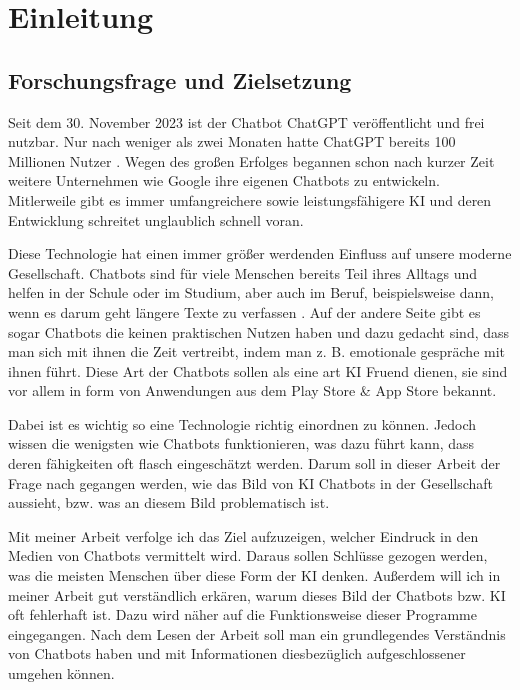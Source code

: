 \section{Einleitung}
	\subsection{Forschungsfrage und Zielsetzung}
	Seit dem 30. November 2023 ist der Chatbot ChatGPT veröffentlicht und frei nutzbar. 
	Nur nach weniger als zwei Monaten hatte ChatGPT bereits 100 Millionen Nutzer \cite[S. 15]{spitzer23}.
	Wegen des großen Erfolges begannen schon nach kurzer Zeit weitere Unternehmen wie Google ihre eigenen 
	Chatbots zu entwickeln. Mitlerweile gibt es immer umfangreichere sowie leistungsfähigere KI und
	deren Entwicklung schreitet unglaublich schnell voran.
	
	Diese Technologie hat einen immer größer werdenden Einfluss auf unsere moderne Gesellschaft. 
	Chatbots sind für viele Menschen bereits Teil ihres Alltags und helfen in der Schule oder
	im Studium, aber auch im Beruf, beispielsweise dann, wenn es darum geht längere Texte zu verfassen \cite[S. 175, S. 185]{shaji23}.
	Auf der andere Seite gibt es sogar Chatbots die keinen praktischen Nutzen haben und dazu gedacht
	sind, dass man sich mit ihnen die Zeit vertreibt, indem man z. B. emotionale gespräche mit ihnen 
	führt. Diese Art der Chatbots sollen als eine art KI Fruend dienen, sie sind vor allem in form
	von Anwendungen aus dem Play Store \& App Store bekannt.
	
	Dabei ist es wichtig so eine Technologie richtig einordnen zu können. Jedoch wissen die wenigsten
	wie Chatbots funktionieren, was dazu führt kann, dass deren fähigkeiten oft flasch eingeschätzt werden. 
	Darum soll in dieser Arbeit der Frage nach gegangen werden, wie das Bild von KI Chatbots in der 
	Gesellschaft aussieht, bzw. was an diesem Bild problematisch ist. 

	Mit meiner Arbeit verfolge ich das Ziel aufzuzeigen, welcher Eindruck in den Medien von Chatbots  
	vermittelt wird. Daraus sollen Schlüsse gezogen werden, was die meisten Menschen über diese Form 
	der KI denken. Außerdem will ich in meiner Arbeit gut verständlich erkären, warum dieses Bild der 
	Chatbots bzw. KI oft fehlerhaft ist. Dazu wird näher auf die Funktionsweise dieser Programme 
	eingegangen. Nach dem Lesen der Arbeit soll man ein grundlegendes Verständnis von Chatbots haben 
	und mit Informationen diesbezüglich aufgeschlossener umgehen können. 

